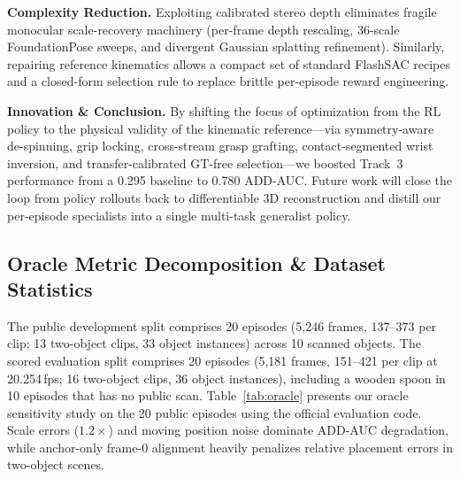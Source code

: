 \documentclass[10pt]{nvidiaextabstract}
\begin{document}
\textbf{Complexity Reduction.} Exploiting calibrated stereo depth eliminates fragile monocular scale-recovery machinery (per-frame depth rescaling, 36-scale FoundationPose sweeps, and divergent Gaussian splatting refinement). Similarly, repairing reference kinematics allows a compact set of standard FlashSAC recipes and a closed-form selection rule to replace brittle per-episode reward engineering.

\textbf{Innovation \& Conclusion.} By shifting the focus of optimization from the RL policy to the physical validity of the kinematic reference—via symmetry-aware de-spinning, grip locking, cross-stream grasp grafting, contact-segmented wrist inversion, and transfer-calibrated GT-free selection—we boosted Track~3 performance from a 0.295 baseline to 0.780 ADD-AUC. Future work will close the loop from policy rollouts back to differentiable 3D reconstruction and distill our per-episode specialists into a single multi-task generalist policy.

\subsection{Oracle Metric Decomposition \& Dataset Statistics}
\label{app:oracle}
The public development split comprises 20 episodes (5,246 frames, 137--373 per clip; 13 two-object clips, 33 object instances) across 10 scanned objects. The scored evaluation split comprises 20 episodes (5,181 frames, 151--421 per clip at 20.254\,fps; 16 two-object clips, 36 object instances), including a wooden spoon in 10 episodes that has no public scan. Table~\ref{tab:oracle} presents our oracle sensitivity study on the 20 public episodes using the official evaluation code. Scale errors ($1.2\times$) and moving position noise dominate ADD-AUC degradation, while anchor-only frame-0 alignment heavily penalizes relative placement errors in two-object scenes.
\end{document}
